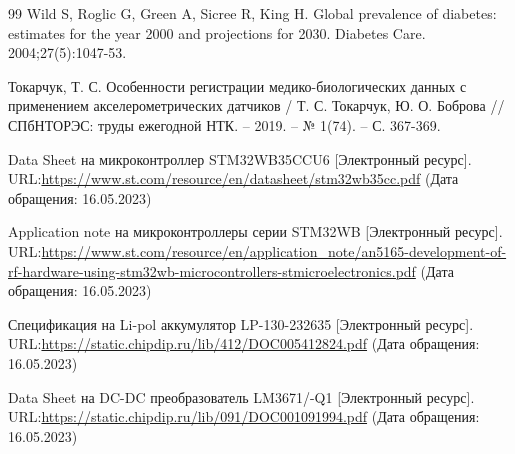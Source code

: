 \newpage
\renewcommand\refname{\centering СПИСОК ИСПОЛЬЗОВАННЫХ ИСТОЧНИКОВ}
\begin {thebibliography} {99}
Wild S, Roglic G, Green A, Sicree R, King H. Global prevalence of diabetes: estimates for the year 2000 and projections for 2030. Diabetes Care. 2004;27(5):1047-53.





Токарчук, Т. С. Особенности регистрации медико-биологических данных с применением акселерометрических датчиков / Т. С. Токарчук, Ю. О. Боброва // СПбНТОРЭС: труды ежегодной НТК. – 2019. – № 1(74). – С. 367-369. 

Data Sheet на микроконтроллер STM32WB35CCU6  [Электронный ресурс]. URL:\href{https://www.st.com/resource/en/datasheet/stm32wb35cc.pdf}{https://www.st.com/resource/en/datasheet/stm32wb35cc.pdf} (Дата обращения: 16.05.2023)


Application note на микроконтроллеры серии STM32WB  [Электронный ресурс]. URL:\href{https://www.st.com/resource/en/application_note/an5165-development-of-rf-hardware-using-stm32wb-microcontrollers-stmicroelectronics.pdf}{https://www.st.com/resource/en/application\_note/an5165-development-of-rf-hardware-using-stm32wb-microcontrollers-stmicroelectronics.pdf} (Дата обращения: 16.05.2023)


Спецификация на Li-pol аккумулятор LP-130-232635  [Электронный ресурс]. URL:\href{https://static.chipdip.ru/lib/412/DOC005412824.pdf}{https://static.chipdip.ru/lib/412/DOC005412824.pdf} (Дата обращения: 16.05.2023)

Data Sheet на DC-DC преобразователь LM3671/-Q1  [Электронный ресурс]. URL:\href{https://static.chipdip.ru/lib/091/DOC001091994.pdf}{https://static.chipdip.ru/lib/091/DOC001091994.pdf} (Дата обращения: 16.05.2023)







\end {thebibliography}



